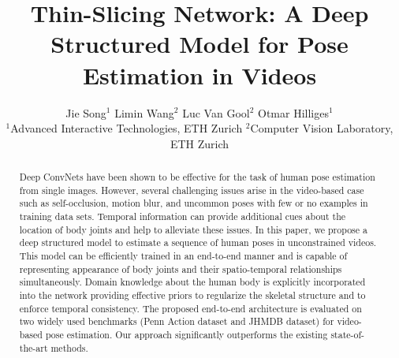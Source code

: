 \documentclass[10pt,twocolumn,letterpaper]{article}
\begin{document}
\title{Thin-Slicing Network: A Deep Structured Model for Pose Estimation in Videos}

\author{Jie Song$^{1}$ \quad \quad Limin Wang$^{2}$ \quad \quad Luc Van Gool$^{2}$ \quad \quad Otmar Hilliges$^1$ \\
\small $^{1}$Advanced Interactive Technologies, ETH Zurich \quad \quad
\small $^{2}$Computer Vision Laboratory, ETH Zurich
}

\maketitle

\begin{abstract}
Deep ConvNets have been shown to be effective for the task of human pose estimation from single images. However, several challenging issues arise in the video-based case such as self-occlusion, motion blur, and uncommon poses with few or no examples in training data sets. Temporal information can provide additional cues about the location of body joints and help to alleviate these issues.
In this paper, we propose a deep structured model to estimate a sequence of human poses in unconstrained videos.
This model can be efficiently trained in an end-to-end manner and is capable of representing appearance of body joints and their spatio-temporal relationships simultaneously. Domain knowledge about the human body is explicitly incorporated into the network providing
effective priors to regularize the skeletal structure and
to enforce temporal consistency. The proposed end-to-end architecture is evaluated on two widely used benchmarks (Penn Action dataset and JHMDB dataset) for video-based pose estimation. Our approach significantly outperforms the existing state-of-the-art methods.
\end{abstract}
\end{document}
